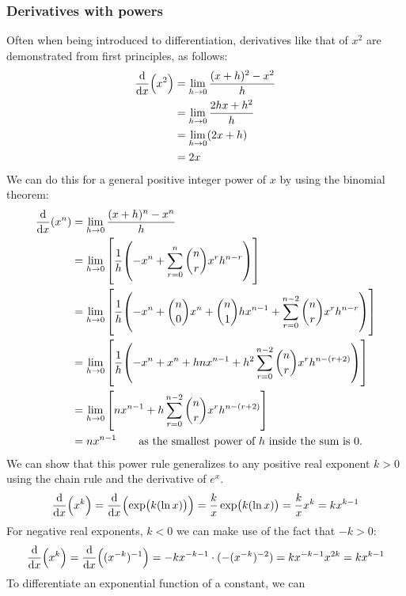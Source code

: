 \documentclass[fleqn,a4paper,11pt]{article}
\begin{document}
    \subsubsection{Derivatives with powers}
    Often when being introduced to differentiation, derivatives like that of
    \(x^2\) are demonstrated from first principles, as follows:
    \begin{align*}
    \dv{x}(x^2) &= \lim_{h \to 0} \frac{(x + h)^2 - x^2} h \\
        &= \lim_{h \to 0} \frac{2hx + h^2} h \\
        &= \lim_{h \to 0} (2x + h) \\
        &= 2x
    \end{align*}
    We can do this for a general positive integer power of \(x\) by using the
    binomial theorem:
    \begin{align*}
    \dv{x}(x^n) &= \lim_{h \to 0} \frac{(x + h)^n - x^n} h \\
        &= \lim_{h \to 0} \bqty{\frac 1h \pqty{-x^n
                              + \sum_{r = 0}^n \binom nr x^r h^{n - r}}} \\
        &= \lim_{h \to 0} \bqty{\frac 1h \pqty{
                                -x^n + \binom n0 x^n + \binom n1 hx^{n - 1}
                              + \sum_{r = 0}^{n - 2}
                                    \binom nr x^r h^{n - r}}} \\
        &= \lim_{h \to 0} \bqty{\frac 1h \pqty{-x^n + x^n + hnx^{n - 1}
                              + h^2 \sum_{r = 0}^{n - 2}
                                    \binom nr x^r h^{n - (r + 2)}}} \\
        &= \lim_{h \to 0} \bqty{nx^{n - 1} + h \sum_{r = 0}^{n - 2}
                                    \binom nr x^r h^{n - (r + 2)}} \\
        &= nx^{n-1} \qquad
            \text{as the smallest power of \(h\) inside the sum is 0.}
    \end{align*}
    We can show that this power rule generalizes to any positive real exponent
    \(k > 0\) using the chain rule and the derivative of \(e^x\).
    \begin{equation*}
    \dv{x}(x^k) = \dv{x}(\exp(k(\ln x))) = \frac kx \exp(k(\ln x))
        = \frac kx x^k = k x^{k - 1}
    \end{equation*}
    For negative real exponents, \(k < 0\) we can make use of the fact that
    \(-k > 0\):
    \begin{equation*}
    \dv{x}(x^k) = \dv{x}((x^{-k})^{-1}) = -kx^{-k-1} \cdot (-(x^{-k})^{-2})
        = kx^{-k-1}x^{2k} = kx^{k - 1}
    \end{equation*}
    To differentiate an exponential function of a constant, we can 
\end{document}
